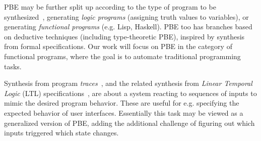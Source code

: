\documentclass{article}
\begin{document}
PBE may be further split up according to the type of program to be synthesized~\citep{bodik2013algorithmic},
generating \emph{logic programs} (assigning truth values to variables),
or generating \emph{functional programs} (e.g. Lisp, Haskell).
PBE too has branches based on deductive techniques (including type-theoretic PBE),
inspired by synthesis from formal specifications.
Our work will focus on PBE in the category of functional programs,
where the goal is to automate traditional programming tasks.


Synthesis from program \emph{traces}~\citep{koskimies1994automatic},
and the related synthesis from \emph{Linear Temporal Logic} (LTL)
specifications~\citep{camacho2019towards}, are about
a system reacting to sequences of inputs to mimic the desired program behavior.
These are useful for e.g. specifying the expected behavior of user interfaces.
Essentially this task may be viewed as a generalized version of PBE,
adding the additional challenge of figuring out which inputs triggered which state changes.


\end{document}

